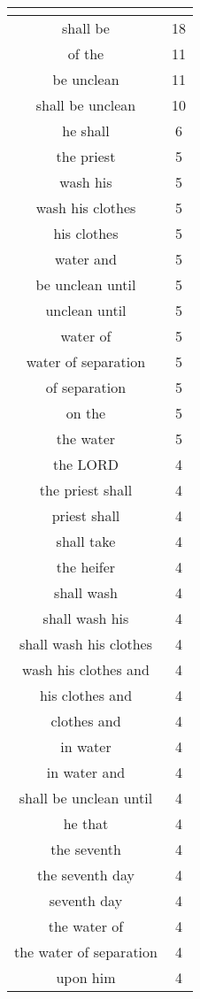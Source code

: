 \begin{center}
\begin{longtable}{|c|c|}
\hline \multicolumn{2}{c}{{ }} \\ \hline
\endfoot 
shall be & 18\\ \hline 
of the & 11\\ \hline 
be unclean & 11\\ \hline 
shall be unclean & 10\\ \hline 
he shall & 6\\ \hline 
the priest & 5\\ \hline 
wash his & 5\\ \hline 
wash his clothes & 5\\ \hline 
his clothes & 5\\ \hline 
water and & 5\\ \hline 
be unclean until & 5\\ \hline 
unclean until & 5\\ \hline 
water of & 5\\ \hline 
water of separation & 5\\ \hline 
of separation & 5\\ \hline 
on the & 5\\ \hline 
the water & 5\\ \hline 
the LORD & 4\\ \hline 
the priest shall & 4\\ \hline 
priest shall & 4\\ \hline 
shall take & 4\\ \hline 
the heifer & 4\\ \hline 
shall wash & 4\\ \hline 
shall wash his & 4\\ \hline 
shall wash his clothes & 4\\ \hline 
wash his clothes and & 4\\ \hline 
his clothes and & 4\\ \hline 
clothes and & 4\\ \hline 
in water & 4\\ \hline 
in water and & 4\\ \hline 
shall be unclean until & 4\\ \hline 
he that & 4\\ \hline 
the seventh & 4\\ \hline 
the seventh day & 4\\ \hline 
seventh day & 4\\ \hline 
the water of & 4\\ \hline 
the water of separation & 4\\ \hline 
upon him & 4\\ \hline 

\end{longtable}
\end{center}
